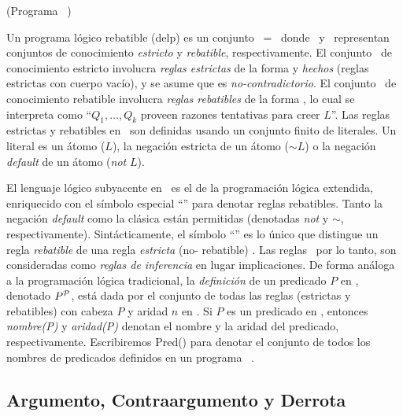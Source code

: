  \begin{definicion}(Programa \DLP\ \PP)
 \label{def:programa_delp}
 
 Un programa lógico rebatible (delp) es un conjunto \PP\ = \SD\ donde
 \SSet\ y \DD\ representan conjuntos de conocimiento \textit{estricto}
 y \textit{rebatible}, respectivamente. El conjunto \SSet\ de
 conocimiento estricto involucra \textit{reglas estrictas} de la forma
  y \textit{hechos} (reglas estrictas con
 cuerpo vacío), y se asume que es \textit{no-contradictorio}.  El
 conjunto \DD\ de conocimiento rebatible involucra \textit{reglas
 rebatibles} de la forma  , lo cual se
 interpreta como ``$Q_1,\ldots,Q_k$ proveen razones tentativas  para
 creer $L$''. Las reglas estrictas y rebatibles en \DLP\ son definidas
 usando un conjunto  finito de literales. Un literal es un átomo ($L$),
 la negación estricta de un átomo ($\sim L$) o  la negación
 \textit{default} de un átomo (\textit{not} $L$).
 
 \end{definicion}
 
 El lenguaje lógico subyacente en \DLP\ es el de la programación lógica
 extendida, enriquecido con el símbolo especial ``\drule{}{}'' para
 denotar reglas rebatibles. Tanto la negación  \textit{default} como la
 clásica están permitidas (denotadas \textit{not} y \textit{$\sim$},
 respectivamente). Sintácticamente, el símbolo ``\drule{}{}'' es lo
 único que distingue un regla \textit{rebatible}
  de una regla \textit{estricta} (no-
 rebatible) .  Las reglas \DLP\, por lo tanto,
 son consideradas como \textit{reglas de inferencia} en lugar
 implicaciones. De forma análoga a la programación lógica tradicional,
 la \textit{definición} de un predicado $P$ en \PP , denotado
 $P^{\scriptsize{\mbox{${\mathcal P}$}}}$, está dada por el conjunto de todas las reglas
 (estrictas y rebatibles) con cabeza $P$  y aridad $n$ en \PP . Si $P$
 es un predicado en \PP , entonces \textit{nombre(P)} y
 \textit{aridad(P)} denotan el nombre y la aridad del predicado,
 respectivamente. Escribiremos \textsf{Pred}(\PP) para denotar el
 conjunto de todos los nombres de predicados definidos en un programa
 \DLP\ \PP.

\subsection{Argumento, Contraargumento y Derrota}
\label{sub:argumento_contraargumento_derrota}
 
